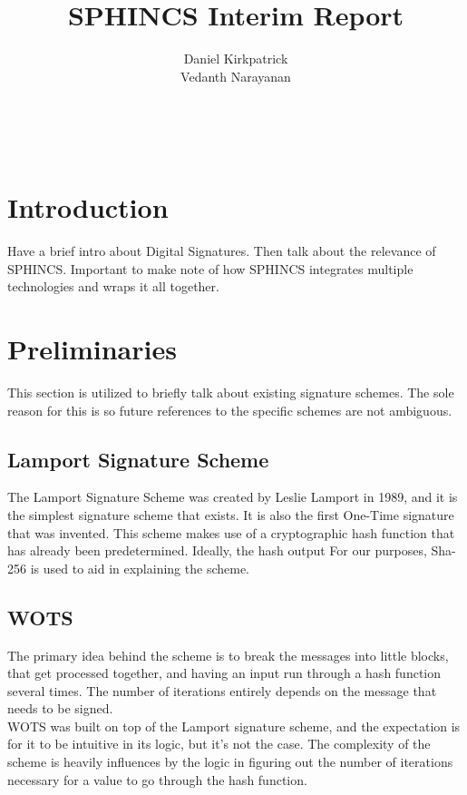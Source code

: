 \documentclass[]{scrartcl}
\title{SPHINCS Interim Report}
\author{Daniel Kirkpatrick\\Vedanth Narayanan}
\makeatletter
\renewcommand{\maketitle}{ %
	\begin{center} %
		{\LARGE\@title} %
		
		\vspace{15pt} %
		{\large\@author} %
		\\\@date %
		
	\end{center}
}
\makeatother
\begin{document}
\maketitle


\section*{Introduction}
Have a brief intro about Digital Signatures. Then talk about the relevance of SPHINCS. Important to make note of how SPHINCS integrates multiple technologies and wraps it all together.

\section*{Preliminaries}
This section is utilized to briefly talk about existing signature schemes. The sole reason for this is so future references to the specific schemes are not ambiguous. 

\subsection*{Lamport Signature Scheme}
The Lamport Signature Scheme was created by Leslie Lamport in 1989, and it is the simplest signature scheme that exists. It is also the first One-Time signature that was invented. This scheme makes use of a cryptographic hash function that has already been predetermined. Ideally, the hash output For our purposes, Sha-256 is used to aid in explaining the scheme.\\

\subsection*{WOTS}
The primary idea behind the scheme is to break the messages into little blocks, that get processed together, and having an input run through a hash function several times. The number of iterations entirely depends on the message that needs to be signed.\\
WOTS was built on top of the Lamport signature scheme, and the expectation is for it to be intuitive in its logic, but it's not the case. The complexity of the scheme is heavily influences by the logic in figuring out the number of iterations necessary for a value to go through the hash function. \\
\end{document}
